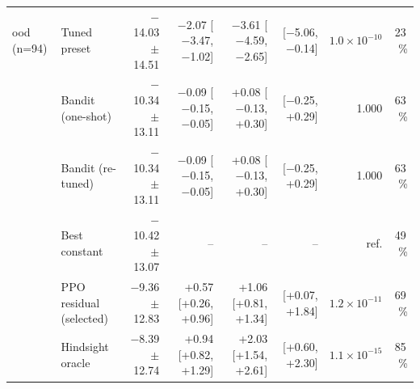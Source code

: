 \begin{table}[t]
\begin{tabular}{llrrrrrr}
\midrule
ood (n=94) & Tuned preset & $-$14.03 $\pm$ 14.51 & $-$2.07 [$-$3.47, $-$1.02] & $-$3.61 [$-$4.59, $-$2.65] & [$-$5.06, $-$0.14] & $1.0{\times}10^{-10}$ & 23\,\%\\
 & Bandit (one-shot) & $-$10.34 $\pm$ 13.11 & $-$0.09 [$-$0.15, $-$0.05] & +0.08 [$-$0.13, +0.30] & [$-$0.25, +0.29] & 1.000 & 63\,\%\\
 & Bandit (re-tuned) & $-$10.34 $\pm$ 13.11 & $-$0.09 [$-$0.15, $-$0.05] & +0.08 [$-$0.13, +0.30] & [$-$0.25, +0.29] & 1.000 & 63\,\%\\
 & Best constant & $-$10.42 $\pm$ 13.07 & -- & -- & -- & ref. & 49\,\%\\
 & PPO residual (selected) & $-$9.36 $\pm$ 12.83 & +0.57 [+0.26, +0.96] & +1.06 [+0.81, +1.34] & [+0.07, +1.84] & $1.2{\times}10^{-11}$ & 69\,\%\\
 & Hindsight oracle & $-$8.39 $\pm$ 12.74 & +0.94 [+0.82, +1.29] & +2.03 [+1.54, +2.61] & [+0.60, +2.30] & $1.1{\times}10^{-15}$ & 85\,\%\\
\bottomrule
\end{tabular}
\end{table}
